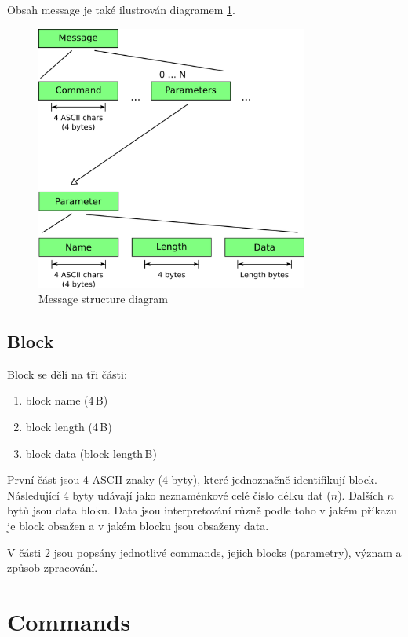 \documentclass[12pt,oneside,a4paper]{report}
\begin{document}
Obsah message je také ilustrován diagramem \ref{picture.message_structure}.

\begin{figure}[h]
  \centering
  \includegraphics[width=0.80\textwidth]{diagrams/message_structure_diagram.png}
  \caption{Message structure diagram}
  \label{picture.message_structure}
\end{figure}

\section{Block}
\label{text.collab_message.block}

Block se dělí na tři části:

\begin{enumerate}
	\item block name (4\,{}B)
	\item block length (4\,{}B)
	\item block data (block length\,{}B)
\end{enumerate}

První část jsou 4 ASCII znaky (4 byty), které jednoznačně identifikují block. Následující 4 byty udávají jako neznaménkové celé číslo délku dat ($n$). Dalších $n$ bytů jsou data bloku. Data jsou interpretování různě podle toho v jakém příkazu je block obsažen a v jakém blocku jsou obsaženy data.

V části \ref{text.commands} jsou popsány jednotlivé commands, jejich blocks (parametry), význam a způsob zpracování.

\chapter{Commands}
\label{text.commands}
\end{document}
